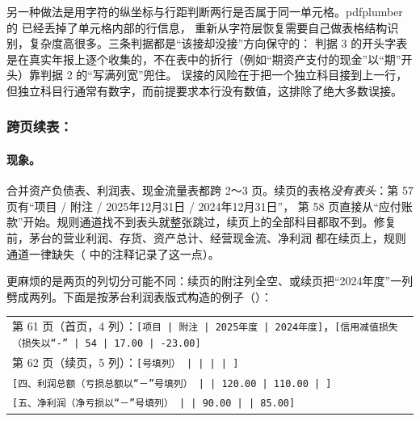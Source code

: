 \begin{tradeoff}
另一种做法是用字符的纵坐标与行距判断两行是否属于同一单元格。pdfplumber 的  已经丢掉了单元格内部的行信息，
重新从字符层恢复需要自己做表格结构识别，复杂度高很多。三条判据都是“该接却没接”方向保守的：
判据 3 的开头字表是在真实年报上逐个收集的，不在表中的折行（例如“期资产支付的现金”以“期”开头）靠判据 2 的“写满列宽”兜住。
误接的风险在于把一个独立科目接到上一行，但独立科目行通常有数字，而前提要求本行没有数值，这排除了绝大多数误接。
\end{tradeoff}

\subsubsection{跨页续表：}
\label{sec:ext-cont}

\paragraph{现象。}
合并资产负债表、利润表、现金流量表都跨 2～3 页。续页的表格\emph{没有表头}：第 57 页有“项目 / 附注 / 2025年12月31日 / 2024年12月31日”，
第 58 页直接从“应付账款”开始。规则通道找不到表头就整张跳过，续页上的全部科目都取不到。修复前，茅台的营业利润、存货、资产总计、经营现金流、净利润
都在续页上，规则通道一律缺失（ 中的注释记录了这一点）。

更麻烦的是两页的列切分可能不同：续页的附注列全空、或续页把“2024年度”一列劈成两列。下面是按茅台利润表版式构造的例子（）：

\begin{center}
\scriptsize
\begin{tabular}{l}
第 61 页（首页，4 列）：\quad \texttt{[项目 | 附注 | 2025年度 | 2024年度]}，\texttt{[信用减值损失（损失以“-” | 54 | 17.00 | -23.00]} \\
第 62 页（续页，5 列）：\quad \texttt{[号填列） |  |  |  | ]} \\
\qquad\qquad\qquad\qquad\qquad \texttt{[四、利润总额（亏损总额以“－”号填列） |  | 120.00 | 110.00 | ]} \\
\qquad\qquad\qquad\qquad\qquad \texttt{[五、净利润（净亏损以“－”号填列） |  | 90.00 |  | 85.00]} \\
\end{tabular}
\end{center}

